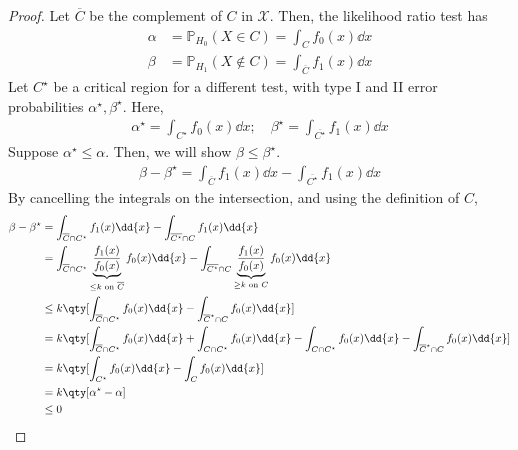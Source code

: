 \begin{proof}
	Let $\overline C$ be the complement of $C$ in $\mathcal X$.
	Then, the likelihood ratio test has
	\begin{align*}
		\alpha &= \mathbb{P}_{H_0}(X \in C) = \int_C f_0(x) \dd{x} \\
		\beta &= \mathbb{P}_{H_1}(X \notin C) = \int_{\overline C} f_1(x) \dd{x}
	\end{align*}
	Let $C^\star$ be a critical region for a different test, with type I and II error probabilities $\alpha^\star, \beta^\star$.
	Here,
	\begin{align*}
		\alpha^\star = \int_{C^\star} f_0(x) \dd{x};\quad \beta^\star = \int_{\overline {C^\star}} f_1(x) \dd{x}
	\end{align*}
	Suppose $\alpha^\star \leq \alpha$.
	Then, we will show $\beta \leq \beta^\star$.
	\begin{align*}
		\beta - \beta^\star = \int_{\overline C} f_1(x) \dd{x} - \int_{\overline{C^\star}} f_1(x) \dd{x}
	\end{align*}
	By cancelling the integrals on the intersection, and using the definition of $C$,
	\begin{align*}
		\beta - \beta^\star & = \int_{\overline C \cap C^\star} f_1(x) \dd{x} - \int_{\overline{C^\star} \cap C} f_1(x) \dd{x}                                                                                         \\
		& = \int_{\overline C \cap C^\star} \underbrace{\frac{f_1(x)}{f_0(x)}}_{\leq k \text{ on } \overline C} f_0(x) \dd{x} - \int_{\overline{C^\star} \cap C} \underbrace{\frac{f_1(x)}{f_0(x)}}_{\geq k \text{ on } C} f_0(x) \dd{x} \\
		& \leq k \qty[ \int_{\overline C \cap C^\star} f_0(x) \dd{x} - \int_{\overline C^\star \cap C} f_0(x) \dd{x} ] \\
		& = k \qty[ \int_{\overline C \cap C^\star} f_0(x) \dd{x} + \int_{C \cap C^\star} f_0(x) \dd{x} - \int_{C \cap C^\star} f_0(x) \dd{x} - \int_{\overline C^\star \cap C} f_0(x) \dd{x} ]    \\
		& = k \qty[ \int_{C^\star} f_0(x) \dd{x} - \int_{C} f_0(x) \dd{x} ] \\
		& = k \qty[ \alpha^\star - \alpha ] \\
		& \leq 0 \qedhere
	\end{align*}
\end{proof}


